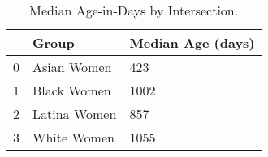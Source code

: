 \begin{table}[htbp]
\centering
\caption{Median Age-in-Days by Intersection.}
\label{tab:eda_age_days_by_group}
\begin{tabular}{lll}
\toprule
 & Group & Median Age (days) \\
\midrule
0 & Asian Women & 423 \\
1 & Black Women & 1002 \\
2 & Latina Women & 857 \\
3 & White Women & 1055 \\
\bottomrule
\end{tabular}

\end{table}